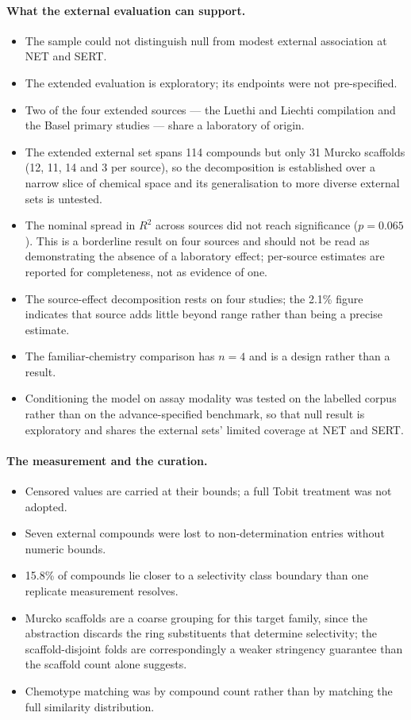 \documentclass[11pt,a4paper]{article}
\begin{document}
\paragraph{What the external evaluation can support.}
\begin{itemize}\setlength\itemsep{0.15em}
\item The sample could not distinguish null from modest external association at NET and
SERT.
\item The extended evaluation is exploratory; its endpoints were not pre-specified.
\item Two of the four extended sources --- the Luethi and Liechti compilation and the
Basel primary studies --- share a laboratory of origin.
\item The extended external set spans 114 compounds but only 31 Murcko scaffolds
(12, 11, 14 and 3 per source), so the decomposition is established over a narrow slice of
chemical space and its generalisation to more diverse external sets is untested.
\item The nominal spread in $R^2$ across sources did not reach significance ($p=0.065$).
This is a borderline result on four sources and should not be read as demonstrating the
absence of a laboratory effect; per-source estimates are reported for completeness, not as
evidence of one.
\item The source-effect decomposition rests on four studies; the 2.1\% figure indicates
that source adds little beyond range rather than being a precise estimate.
\item The familiar-chemistry comparison has $n=4$ and is a design rather than a result.
\item Conditioning the model on assay modality was tested on the labelled corpus rather
than on the advance-specified benchmark, so that null result is exploratory and shares the
external sets' limited coverage at NET and SERT.
\end{itemize}

\paragraph{The measurement and the curation.}
\begin{itemize}\setlength\itemsep{0.15em}
\item Censored values are carried at their bounds; a full Tobit treatment was not adopted.
\item Seven external compounds were lost to non-determination entries without numeric
bounds.
\item 15.8\% of compounds lie closer to a selectivity class boundary than one replicate
measurement resolves.
\item Murcko scaffolds are a coarse grouping for this target family, since the abstraction
discards the ring substituents that determine selectivity; the scaffold-disjoint folds are
correspondingly a weaker stringency guarantee than the scaffold count alone suggests.
\item Chemotype matching was by compound count rather than by matching the full similarity
distribution.
\end{itemize}
\end{document}
